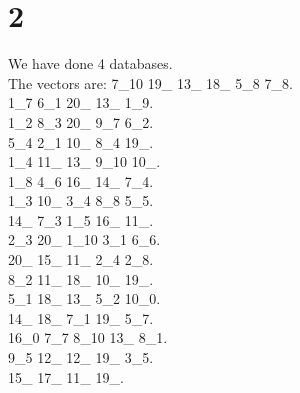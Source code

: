 \chapter{2}
\indent We have done 4 databases.\\
The vectors are:
7\_10 19\_ 13\_ 18\_ 5\_8 7\_8.\\1\_7 6\_1 20\_ 13\_ 1\_9.\\1\_2 8\_3 20\_ 9\_7 6\_2.\\5\_4 2\_1 10\_ 8\_4 19\_.\\1\_4 11\_ 13\_ 9\_10 10\_.\\1\_8 4\_6 16\_ 14\_ 7\_4.\\1\_3 10\_ 3\_4 8\_8 5\_5.\\14\_ 7\_3 1\_5 16\_ 11\_.\\2\_3 20\_ 1\_10 3\_1 6\_6.\\20\_ 15\_ 11\_ 2\_4 2\_8.\\8\_2 11\_ 18\_ 10\_ 19\_.\\5\_1 18\_ 13\_ 5\_2 10\_0.\\14\_ 18\_ 7\_1 19\_ 5\_7.\\16\_0 7\_7 8\_10 13\_ 8\_1.\\9\_5 12\_ 12\_ 19\_ 3\_5.\\15\_ 17\_ 11\_ 19\_.\\